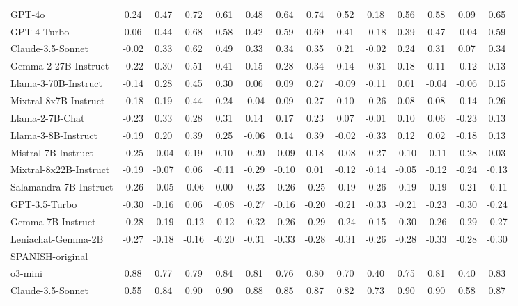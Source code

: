 \begin{table*}[ht]
{\begin{tabular}{lccccccccccccc}
GPT-4o & 0.24 & 0.47 & 0.72 & 0.61 & 0.48 & 0.64 & 0.74 & 0.52 & 0.18 & 0.56 & 0.58 & 0.09 & 0.65 \\
GPT-4-Turbo & 0.06 & 0.44 & 0.68 & 0.58 & 0.42 & 0.59 & 0.69 & 0.41 & -0.18 & 0.39 & 0.47 & -0.04 & 0.59 \\
Claude-3.5-Sonnet & -0.02 & 0.33 & 0.62 & 0.49 & 0.33 & 0.34 & 0.35 & 0.21 & -0.02 & 0.24 & 0.31 & 0.07 & 0.34 \\
Gemma-2-27B-Instruct & -0.22 & 0.30 & 0.51 & 0.41 & 0.15 & 0.28 & 0.34 & 0.14 & -0.31 & 0.18 & 0.11 & -0.12 & 0.13 \\
Llama-3-70B-Instruct & -0.14 & 0.28 & 0.45 & 0.30 & 0.06 & 0.09 & 0.27 & -0.09 & -0.11 & 0.01 & -0.04 & -0.06 & 0.15 \\
Mixtral-8x7B-Instruct & -0.18 & 0.19 & 0.44 & 0.24 & -0.04 & 0.09 & 0.27 & 0.10 & -0.26 & 0.08 & 0.08 & -0.14 & 0.26 \\
Llama-2-7B-Chat & -0.23 & 0.33 & 0.28 & 0.31 & 0.14 & 0.17 & 0.23 & 0.07 & -0.01 & 0.10 & 0.06 & -0.23 & 0.13 \\
Llama-3-8B-Instruct & -0.19 & 0.20 & 0.39 & 0.25 & -0.06 & 0.14 & 0.39 & -0.02 & -0.33 & 0.12 & 0.02 & -0.18 & 0.13 \\
Mistral-7B-Instruct & -0.25 & -0.04 & 0.19 & 0.10 & -0.20 & -0.09 & 0.18 & -0.08 & -0.27 & -0.10 & -0.11 & -0.28 & 0.03 \\
Mixtral-8x22B-Instruct & -0.19 & -0.07 & 0.06 & -0.11 & -0.29 & -0.10 & 0.01 & -0.12 & -0.14 & -0.05 & -0.12 & -0.24 & -0.13 \\
Salamandra-7B-Instruct & -0.26 & -0.05 & -0.06 & 0.00 & -0.23 & -0.26 & -0.25 & -0.19 & -0.26 & -0.19 & -0.19 & -0.21 & -0.11 \\
GPT-3.5-Turbo & -0.30 & -0.16 & 0.06 & -0.08 & -0.27 & -0.16 & -0.20 & -0.21 & -0.33 & -0.21 & -0.23 & -0.30 & -0.24 \\
Gemma-7B-Instruct & -0.28 & -0.19 & -0.12 & -0.12 & -0.32 & -0.26 & -0.29 & -0.24 & -0.15 & -0.30 & -0.26 & -0.29 & -0.27 \\
Leniachat-Gemma-2B & -0.27 & -0.18 & -0.16 & -0.20 & -0.31 & -0.33 & -0.28 & -0.31 & -0.26 & -0.28 & -0.33 & -0.28 & -0.30 \\
\midrule
SPANISH-original  &&&&&&&&&&&\\
\midrule
o3-mini & 0.88 & 0.77 & 0.79 & 0.84 & 0.81 & 0.76 & 0.80 & 0.70 & 0.40 & 0.75 & 0.81 & 0.40 & 0.83 \\
Claude-3.5-Sonnet & 0.55 & 0.84 & 0.90 & 0.90 & 0.88 & 0.85 & 0.87 & 0.82 & 0.73 & 0.90 & 0.90 & 0.58 & 0.87 \\

\end{tabular}}
\end{table*}
